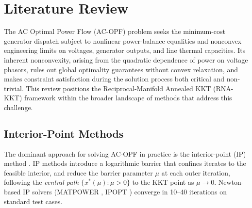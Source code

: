 \documentclass[11pt,onecolumn]{article}
\theoremstyle{definition}
\theoremstyle{remark}
\begin{document}
\section{Literature Review}
The AC Optimal Power Flow (AC-OPF) problem seeks the minimum-cost generator dispatch subject to nonlinear power-balance equalities and nonconvex engineering limits on voltages, generator outputs, and line thermal capacities. Its inherent nonconvexity, arising from the quadratic dependence of power on voltage phasors, rules out global optimality guarantees without convex relaxation, and makes constraint satisfaction during the solution process both critical and non-trivial. This review positions the Reciprocal-Manifold Annealed KKT (RNA-KKT) framework within the broader landscape of methods that address this challenge.

\subsection{Interior-Point Methods}

The dominant approach for solving AC-OPF in practice is the interior-point (IP) method \cite{wright1997,nocedal2006,wachter2006}. IP methods introduce a logarithmic barrier that confines iterates to the feasible interior, and reduce the barrier parameter $\mu$ at each outer iteration, following the \emph{central path} $\{x^*(\mu) : \mu > 0\}$ to the KKT point as $\mu \to 0$. Newton-based IP solvers (MATPOWER \cite{zimmerman2011}, IPOPT \cite{wachter2006}) converge in 10--40 iterations on standard test cases.
\end{document}
